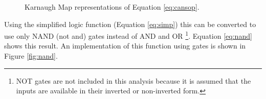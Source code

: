 \documentclass[12pt]{article}
\begin{document}
\begin{figure}[!hbt]
\begin{center}







\end{center}
\caption{Karnaugh Map representations of Equation \ref{eq:cansop}.}
\label{fig:karnmap}
\end{figure}

Using the simplified logic function (Equation \ref{eq:simp}) this
can be converted to use only NAND (not and) gates instead of AND and OR
\footnote{NOT gates are not included in this analysis because it
is assumed that the inputs are available in their inverted or non-inverted form.}.
Equation \ref{eq:nand} shows this result.
An implementation of this function using gates is shown in Figure \ref{fig:nand}.
\end{document}
